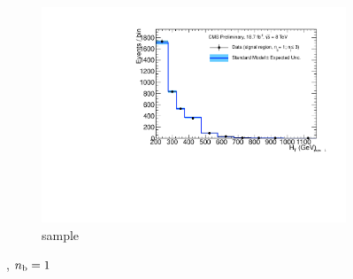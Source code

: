 \begin{figure}[h!]
\begin{subfigure}[b]{0.48\textwidth}
    \includegraphics[width=\textwidth,page=6]
    {Figs/results/v0/blueBand/bestFit_2012dev_RQcdZero_fZinvAll_1b_le3j-12hp_smOnly}
    \caption{\gj sample}
  \end{subfigure}
  \caption{\njlow, $n_{\text{b}} = 1$}
  \label{fig:blue_fits_1b_le3j}
\end{figure}

